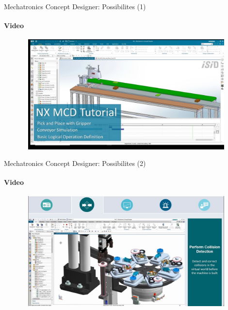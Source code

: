 \documentclass[aspectratio=169]{beamer}
\begin{document}
\begin{frame}[t]{Mechatronics Concept Designer: Possibilites (1)}
    \framesubtitle{Video}
    \vspace{-0.6cm}
    \begin{figure}[H]
        \href{https://youtu.be/x3ncDZdelRY?t=2381}{
            \centering\includegraphics[height=6cm,width=1\textwidth,keepaspectratio]{mcd_video1_preview.jpg}}
        \label{fig:mcd_video1_preview.jpg}
    \end{figure}
\end{frame}

\begin{frame}[t]{Mechatronics Concept Designer: Possibilites (2)}
    \framesubtitle{Video}
    \vspace{-0.6cm}
    \begin{figure}[H]
        \href{https://youtu.be/ZvrE2IfrfgI}{
            \centering\includegraphics[height=6cm,width=1\textwidth,keepaspectratio]{mcd_video2_preview.jpg}}
        \label{fig:mcd_video2_preview.jpg}
    \end{figure}
\end{frame}
\end{document}
